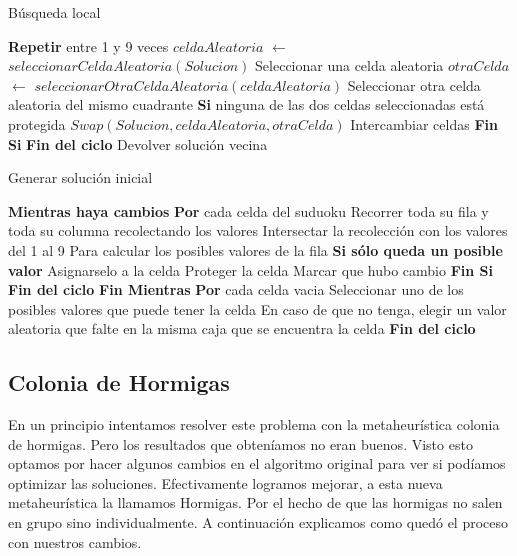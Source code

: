 \begin{algorithm}
\caption{B\'usqueda local}\label{BusquedaLocal}
\begin{algorithmic}[1]
\State \textbf{Repetir} entre 1 y 9 veces
\State\indent $celdaAleatoria$ $\gets$ $seleccionarCeldaAleatoria(Solucion)$
\Comment Seleccionar una celda aleatoria
\State\indent $otraCelda$ $\gets$ $seleccionarOtraCeldaAleatoria(celdaAleatoria)$
\Comment Seleccionar otra celda aleatoria del mismo cuadrante
\State\indent \textbf{Si} ninguna de las dos celdas seleccionadas est\'a protegida
\State\indent\indent $Swap(Solucion, celdaAleatoria, otraCelda)$ 
\Comment Intercambiar celdas
\State\indent \textbf{Fin Si}
\State \textbf{Fin del ciclo}
\State Devolver soluci\'on vecina

\EndFunction
\end{algorithmic}
\end{algorithm}

\begin{algorithm}
\caption{Generar soluci\'on inicial}\label{GenerarSolucionInicial}
\begin{algorithmic}[1]
\State \textbf{Mientras haya cambios}
\State\indent \textbf{Por} cada celda del suduoku
\State\indent\indent Recorrer toda su fila y toda su columna recolectando los valores
\State\indent\indent Intersectar la recolecci\'on con los valores del 1 al 9
\Comment Para calcular los posibles valores de la fila
\State\indent\indent \textbf{Si s\'olo queda un posible valor}
\State\indent\indent \indent Asignarselo a la celda
\State\indent\indent \indent Proteger la celda
\State\indent\indent \indent Marcar que hubo cambio
\State\indent\indent \textbf{Fin Si}
\State\indent \textbf{Fin del ciclo} 
\State \textbf{Fin Mientras}
\State \textbf{Por} cada celda vacia
\State\indent Seleccionar uno de los posibles valores que puede tener la celda 
\State\indent En caso de que no tenga, elegir un valor aleatoria que falte en la misma caja que se encuentra la celda
\State \textbf{Fin del ciclo}
\EndFunction
\end{algorithmic}
\end{algorithm}

\subsection{Colonia de Hormigas}

En un principio intentamos resolver este problema con la metaheurística colonia de hormigas. Pero los resultados que obteníamos no eran buenos. Visto esto optamos por hacer algunos cambios en el algoritmo original para ver si podíamos optimizar las soluciones. Efectivamente logramos mejorar, a esta nueva metaheurística la llamamos Hormigas. Por el hecho de que las hormigas no salen en grupo sino individualmente. A continuación explicamos como qued\'o el proceso con nuestros cambios.
